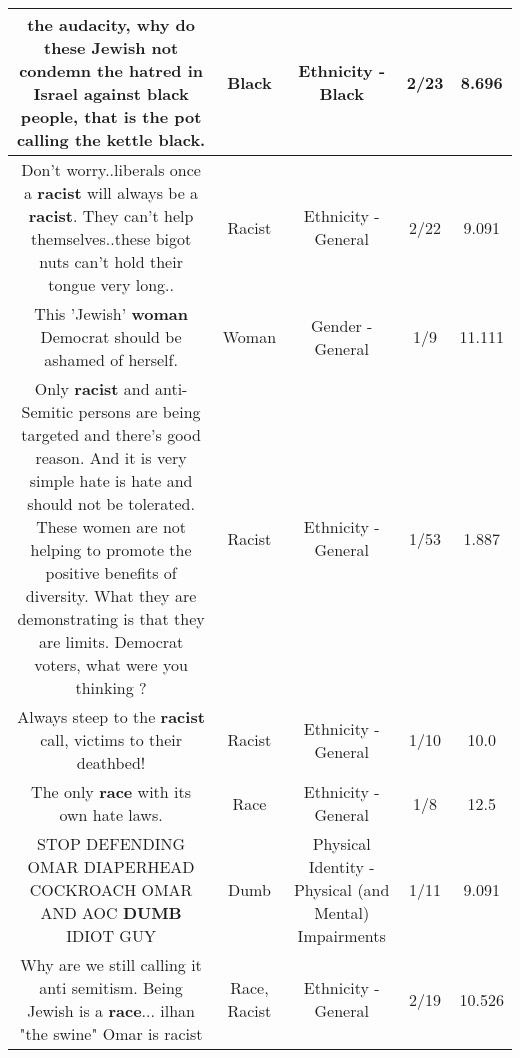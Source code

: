 \documentclass[11pt]{article}
\newlength\mylength
\begin{document}
\begin{center}
\begin{longtable}{|C{.65\mylength}|C{.30\mylength}|C{.12\mylength}|C{.12\mylength}|C{.12\mylength}|}
  \small the audacity, why do these Jewish not condemn the hatred in Israel against \textbf{black} people, that is the pot calling the kettle \textbf{black}.\normalsize   & Black & Ethnicity - Black & 2/23 & 8.696 \\  \hline
  \small Don't worry..liberals once a \textbf{racist} will always be a \textbf{racist}. They can't help themselves..these bigot nuts  can't  hold their tongue very long..\normalsize   & Racist & Ethnicity - General & 2/22 & 9.091 \\  \hline
  \small This 'Jewish' \textbf{woman} Democrat should be ashamed of herself.\normalsize   & Woman & Gender - General & 1/9 & 11.111 \\  \hline
  \small Only \textbf{racist} and anti-Semitic persons are being targeted and there's good reason. And it is very simple hate is hate and should not be tolerated. These women are not helping to promote the positive benefits  of diversity. What they are demonstrating is that they are limits. Democrat voters, what were you thinking ?\normalsize   & Racist & Ethnicity - General & 1/53 & 1.887 \\  \hline
  \small Always steep to the \textbf{racist} call, victims to their deathbed!\normalsize   & Racist & Ethnicity - General & 1/10 & 10.0 \\  \hline
  \small The only \textbf{race} with its own hate laws.\normalsize   & Race & Ethnicity - General & 1/8 & 12.5 \\  \hline
  \small STOP DEFENDING OMAR DIAPERHEAD COCKROACH  OMAR AND AOC \textbf{DUMB} IDIOT GUY\normalsize   & Dumb & Physical Identity - Physical (and Mental) Impairments & 1/11 & 9.091 \\  \hline
  \small Why are we still calling it anti semitism. Being Jewish is a \textbf{race}... ilhan "the swine" Omar is racist\normalsize   & Race, Racist & Ethnicity - General & 2/19 & 10.526 \\  \hline

\end{longtable}
\end{center}
\end{document}
